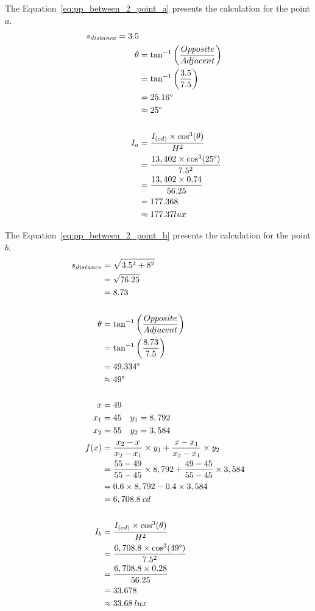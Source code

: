 The Equation~\ref{eq:pp_between_2_point_a} presents the calculation for the point $a$.
\begin{equation}
\begin{split}
s_{distance} = 3.5\\
\theta &= \tan^{-1}\left( \frac{Opposite}{Adjacent} \right) \\
 & = \tan^{-1}\left( \frac{3.5}{7.5} \right) \\
 & = 25.16\degree \\
 & \approx 25\degree\\
\\
I_a &= \frac{I_{(cd)} \times \cos^3(\theta)}{H^2} \\
 &= \frac{13,402 \times \cos^3(25\degree)}{7.5^2} \\
 &= \frac{13,402 \times 0.74}{56.25} \\
 & = 177.368 \\
 & \approx 177.37 lux
\end{split}
\label{eq:pp_between_2_point_a}
\end{equation}

The Equation~\ref{eq:pp_between_2_point_b} presents the calculation for the point $b$.
\begin{equation}
\begin{split}
s_{distance} & = \sqrt{3.5^2 + 8^2} \\
 & = \sqrt{76.25} \\
 & = 8.73 \\
\\
\theta &= \tan^{-1}\left( \frac{Opposite}{Adjacent} \right) \\
 & = \tan^{-1}\left( \frac{8.73}{7.5} \right) \\
 & = 49.334\degree \\
 & \approx 49\degree\\
\\
x & = 49 \\
x_1 & = 45 \quad y_1 = 8,792 \\
x_2 & = 55 \quad y_2 = 3,584 \\
f(x) &= \frac{x_2 - x}{x_2 - x_1} \times y_1 +
       \frac{x - x_1}{x_2 - x_1} \times y_2 \\
 &= \frac{55 - 49}{55 - 45} \times 8,792 +
    \frac{49 - 45}{55 - 45} \times 3,584 \\
 & = 0.6 \times 8,792 - 0.4 \times 3,584 \\
 & = 6,708.8\: cd \\
\\
I_b &= \frac{I_{(cd)} \times \cos^3(\theta)}{H^2} \\
 &= \frac{6,708.8 \times \cos^3(49\degree)}{7.5^2} \\
 &= \frac{6,708.8 \times 0.28}{56.25} \\
 & = 33.678 \\
 & \approx 33.68\: lux
\end{split}
\label{eq:pp_between_2_point_b}
\end{equation}

